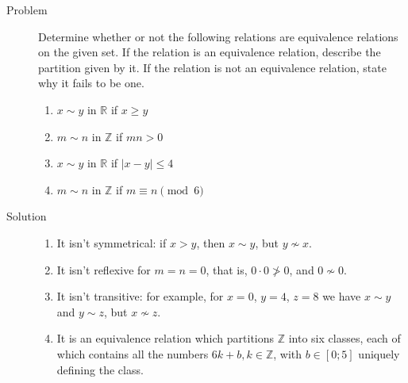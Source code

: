 \begin{description}
\item[Problem]
Determine whether or not the following relations are equivalence relations on
the given set. If the relation is an equivalence relation, describe the
partition given by it. If the relation is not an equivalence relation, state
why it fails to be one.
\begin{multicols}{2}
\begin{enumerate}
\item $x \sim y$ in $\mathbb{R}$ if $x \ge y$
\item $m \sim n$ in $\mathbb{Z}$ if $mn > 0$
\item $x \sim y$ in $\mathbb{R}$ if $|x - y| \le 4$
\item $m \sim n$ in $\mathbb{Z}$ if $m \equiv n \pmod 6$
\end{enumerate}
\end{multicols}
\item[Solution]
\begin{enumerate}
\item It isn't symmetrical: if $x > y$, then $x \sim y$, but $y \not\sim x$.
\item It isn't reflexive for $m = n = 0$, that is, $0 \cdot 0 \not > 0$, and
$0 \not\sim 0$.
\item It isn't transitive: for example, for $x = 0$, $y = 4$, $z = 8$ we have
$x \sim y$ and $y \sim z$, but $x \not\sim z$.
\item It is an equivalence relation which partitions $\mathbb{Z}$ into six
classes, each of which contains all the numbers $6k + b, k \in \mathbb{Z}$,
with $b \in [0; 5]$ uniquely defining the class.
\end{enumerate}
\end{description}
